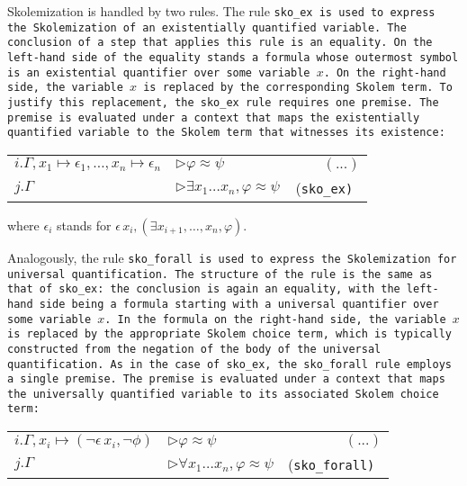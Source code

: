 Skolemization is handled by two rules.
The rule \tt{sko\_ex} is used to express the Skolemization of an existentially quantified variable. 
The conclusion of a step that applies this rule is an equality. 
On the left-hand side of the equality stands a formula whose outermost symbol is an existential quantifier over some variable $x$. 
On the right-hand side, the variable $x$ is replaced by the corresponding Skolem term. 
To justify this replacement, the \tt{sko\_ex} rule requires one premise. 
The premise is evaluated under a context that maps the existentially quantified variable to the Skolem term that witnesses its existence:

\smallskip

\begin{tabular}{l l r}
$i. \Gamma, x_1 \mapsto \epsilon_1, \dots, x_n \mapsto \epsilon_n$ & $\triangleright \varphi \approx \psi$ & $\qquad   (...)$ \\
$j. \Gamma$  & $\triangleright \exists x_1 \dots x_n, \varphi \approx \psi$ \qquad & (\tt{sko\_ex}) \\
\end{tabular}

where $\epsilon_i$ stands for $\epsilon\,x_i, (\exists x_{i+1}, \dots , x_n, \varphi)$.

\smallskip

Analogously, the rule \tt{sko\_forall} is used to express the Skolemization for universal quantification. 
The structure of the rule is the same as that of \tt{sko\_ex}: the conclusion is again an equality, with the left-hand side being a formula starting with a universal quantifier over some variable $x$. 
In the formula on the right-hand side, the variable $x$ is replaced by the appropriate Skolem choice term, which is typically constructed from the negation of the body of the universal quantification. 
As in the case of \tt{sko\_ex}, the \tt{sko\_forall} rule employs a single premise. 
The premise is evaluated under a context that maps the universally quantified variable to its associated Skolem choice term:

\begin{tabular}{l l r}
$i. \Gamma, x_i \mapsto (\neg \epsilon\,x_i, \neg \phi)$ & $\triangleright \varphi \approx \psi$ & $\qquad   (...)$ \\
$j. \Gamma$  & $\triangleright \forall x_1 \dots x_n, \varphi \approx \psi$ \qquad & (\tt{sko\_forall}) \\
\end{tabular}


